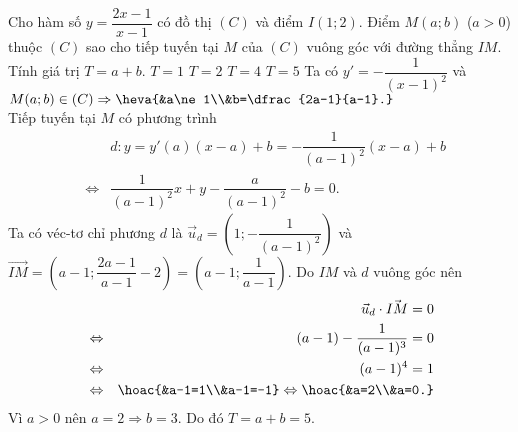 \begin{ex}%
	Cho hàm số $y=\dfrac{2x-1}{x-1}$ có đồ thị $(C)$ và điểm $I(1;2)$. Điểm $M(a;b)$ ($a>0$) thuộc $(C)$ sao cho tiếp tuyến tại $M$ của $(C)$ vuông góc với đường thẳng $IM$. Tính giá trị $T=a+b$.
	\choice
	{$T=1$}
	{$T=2$}
	{$T=4$}
	{\True $T=5$}
	\loigiai
	{
		Ta có $y'=-\dfrac{1}{(x-1)^2}$ và $M(a;b)\in(C)\Rightarrow\heva{&a\ne1\\&b=\dfrac{2a-1}{a-1}.}$\\
		Tiếp tuyến tại $M$ có phương trình 
		\begin{eqnarray*}
			& &d\colon y=y'(a)(x-a)+b=-\dfrac{1}{(a-1)^2}(x-a)+b \\
			& \Leftrightarrow &\dfrac{1}{(a-1)^2}x+y-\dfrac{a}{(a-1)^2}-b=0.
		\end{eqnarray*}
		Ta có véc-tơ chỉ phương $d$ là $\vec{u}_d=\left(1;-\dfrac{1}{(a-1)^2}\right)$ và $\vec{IM}=\left(a-1;\dfrac{2a-1}{a-1}-2\right)=\left(a-1;\dfrac{1}{a-1}\right)$.
		Do $IM$ và $d$ vuông góc nên 
		\begin{eqnarray*}
			& & \vec{u}_d\cdot\vec{IM}=0 \\
			& \Leftrightarrow & (a-1)-\dfrac{1}{(a-1)^3}=0\\
			& \Leftrightarrow & (a-1)^4=1\\
			& \Leftrightarrow & \hoac{&a-1=1\\&a-1=-1}\Leftrightarrow\hoac{&a=2\\&a=0.}
		\end{eqnarray*}
	Vì $a>0$ nên $a=2\Rightarrow b=3$.
	Do đó $T=a+b=5.$
	}
\end{ex}

